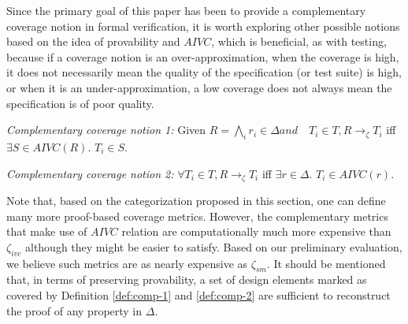 
Since the primary goal of
 this paper has been to provide a complementary coverage notion in
  formal verification, it is worth exploring other possible notions based on the idea of provability and $AIVC$, which is beneficial, as with testing, because if a coverage notion is an over-approximation, when the coverage
 is high, it does not necessarily mean the quality of
 the specification (or test suite) is high, or when it is an under-approximation, a low coverage does not always mean the specification is of poor quality.

\begin{definition} {\emph{Complementary coverage notion 1:}}
  \label{def:comp-1}
   Given $ R = \bigwedge_{i} {r_i \in \Delta} and \quad T_i \in T,  R \rightarrow_\zeta T_i$ iff $ \exists S
   \in AIVC(R)$. $T_i \in S$.
\end{definition}

\begin{definition} {\emph{Complementary coverage notion 2:}}
  \label{def:comp-2}
   $\forall T_i \in T,  R \rightarrow_\zeta T_i$ iff $\exists r \in \Delta$. $T_i \in AIVC(r)$.
\end{definition}

Note that, based on the categorization proposed in this section, one can define many more proof-based coverage metrics. However, the complementary metrics that make use of $AIVC$ relation are computationally much more expensive than $\zeta_{ivc}$ although they might be easier to satisfy. Based on our preliminary evaluation, we believe such metrics are as nearly expensive as $\zeta_{sm}$. It should be mentioned that, in terms of preserving provability, a set of design elements marked as covered by Definition \ref{def:comp-1} and \ref{def:comp-2} are
sufficient to reconstruct the proof of any property in $\Delta$.



